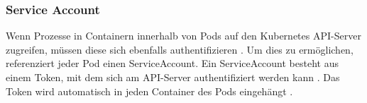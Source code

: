 \subsubsection{Service Account}
\label{subsec:kubernetes:serviceaccount}
Wenn Prozesse in Containern innerhalb von Pods auf den Kubernetes API-Server zugreifen, müssen diese sich ebenfalls authentifizieren \cite{kubernetesServiceAccounts}.
Um dies zu ermöglichen, referenziert jeder Pod einen ServiceAccount. Ein ServiceAccount besteht aus einem Token, mit dem sich am
API-Server authentifiziert werden kann \cite{kubernetesServiceAccounts}.
Das Token wird automatisch in jeden Container des Pods eingehängt \cite{kubernetesServiceAccounts}.

